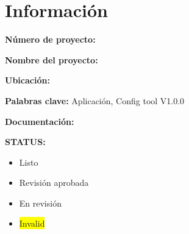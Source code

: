 \chapter{Información}
\vspace{3cm}

\noindent\Large\textbf{Número de proyecto:}\\
\vspace{5mm}

\noindent\Large\textbf{Nombre del proyecto:}\\
\vspace{5mm}

\noindent\Large\textbf{Ubicación:}\\
\vspace{5mm}

\noindent\Large\textbf{Palabras clave:} Aplicación, Config tool V1.0.0\\
\vspace{5mm}

\noindent\Large\textbf{Documentación:} \thesistitle \\
\vspace{5mm}

\noindent\LARGE\textbf{STATUS:}\\
\begin{itemize}
    \item\Large Listo
    \item\Large Revisión aprobada
    \item\Large En revisión
    \item\Large \colorbox{yellow}{Invalid}
\end{itemize}